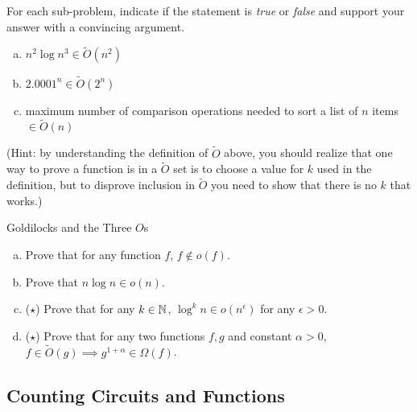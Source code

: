 \documentclass[11pt]{article}
\begin{document}
\begin{problem}
\rm For each sub-problem, indicate if the statement is \emph{true} or \emph{false} and support your answer with a convincing argument. \end{problem}

\begin{enumerate}[(a)]
    \item $n^2\log n^3 \in \widetilde{O}(n^2)$
    \item $2.0001^n \in \widetilde{O}(2^n)$
    \item maximum number of comparison operations needed to sort a list of $n$ items $\in \widetilde{O}(n)$
\end{enumerate}

(Hint: by understanding the definition of $\widetilde{O}$ above, you should realize that one way to prove a function is in a $\widetilde{O}$ set is to choose a value for $k$ used in the definition, but to disprove inclusion in $\widetilde{O}$ you need to show that there is no $k$ that works.)


\begin{problem}
Goldilocks and the Three $O$s
\end{problem}

\begin{enumerate}[(a)]
    \item Prove that for any function $f$, $f \notin o(f)$.
    \item Prove that $n \log n \in o(n)$.
    \item ($\star$) Prove that for any $k \in \mathbb{N}$, $\log^k n \in o(n^\epsilon)$ for any $\epsilon > 0$.
    \item ($\star$) Prove that for any two functions $f, g$ and constant $\alpha>0$, $f \in \widetilde{O}(g) \implies g^{1+\alpha} \in \Omega(f)$.
\end{enumerate}

\subsection*{Counting Circuits and Functions}
\end{document}
